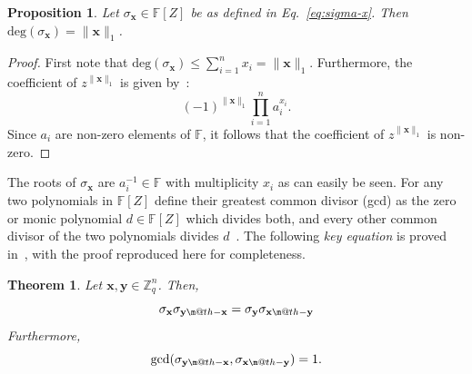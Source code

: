 \documentclass[pdflatex,sn-mathphys-num]{sn-jnl}
\makeatletter
\newcommand{\dotdiv}{\mathbin{\text{\@dotdiv}}}
\newcommand{\@dotdiv}{%
  \ooalign{\hidewidth\raise1ex\hbox{.}\hidewidth\cr$\m@th-$\cr}%
}
\newtheorem{proposition}{Proposition}
\newtheorem{theorem}{Theorem}
\theoremstyle{definition}
\newcommand{\vtr}[1]{\mathbf{#1}}
\newcommand{\norm}[1]{\lVert{#1}\rVert}
\makeatother
\begin{document}
\begin{proposition}
\label{prop:sigma-x-facts}
Let $\sigma_\vtr{x} \in \mathbb{F}[Z]$ be as defined in Eq.~\eqref{eq:sigma-x}. Then $\text{deg}(\sigma_\vtr{x}) = \norm{\vtr{x}}_1$. 
\end{proposition}
\begin{proof}
First note that $\text{deg}(\sigma_\vtr{x}) \leq \sum_{i=1}^n x_i = \norm{\vtr{x}}_1$. Furthermore, the coefficient of $z^{\norm{\vtr{x}}_1}$ is given by~\cite[\S 8.6, p. 244]{toecc-book}:
\[
(-1)^{\norm{\vtr{x}}_1} \prod_{i=1}^n a_i^{x_i}.
\]
Since $a_i$ are non-zero elements of $\mathbb{F}$, it follows that the coefficient of $z^{\norm{\vtr{x}}_1}$ is non-zero. 
\end{proof}
The roots of $\sigma_\vtr{x}$ are $a_i^{-1} \in \mathbb{F}$ with multiplicity $x_i$ as can easily be seen. For any two polynomials in $\mathbb{F}[Z]$ define their greatest common divisor (gcd) as the zero or monic polynomial $d \in \mathbb{F}[Z]$ which divides both, and every other common divisor of the two polynomials divides $d$~\cite[\S 16.3]{shoup-nt-book}. The following \emph{key equation} is proved in~\cite{tallinil1codes}, with the proof reproduced here for completeness.
\begin{theorem}
\label{theo:key-equation}
Let $\vtr{x}, \vtr{y} \in \mathbb{Z}_q^n$. Then,
\[
\sigma_\vtr{x} \sigma_{\vtr{y} \dotdiv \vtr{x}}= \sigma_\vtr{y} \sigma_{\vtr{x} \dotdiv \vtr{y}}
\]
Furthermore,
\[
\gcd(\sigma_{\vtr{y} \dotdiv \vtr{x}}, \sigma_{\vtr{x} \dotdiv \vtr{y}}) = 1.
\]
\end{theorem}
\end{document}

